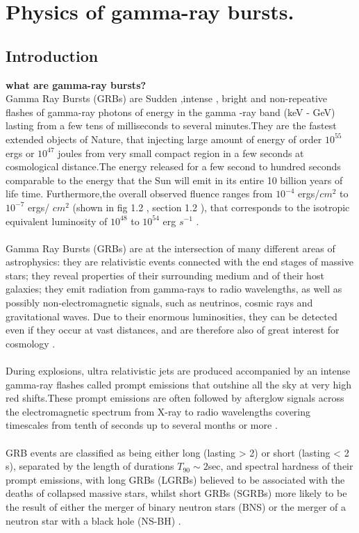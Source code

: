 \setcounter{chapter}{0}
\chapter{Physics of gamma-ray bursts.}
\section{Introduction}
\textbf{what are gamma-ray bursts?}\\
Gamma Ray Bursts (GRBs) are Sudden ,intense , bright and non-repeative flashes of gamma-ray
photons of energy in the gamma -ray band (keV - GeV) lasting from a few tens of milliseconds  to several minutes.They are the fastest extended objects of Nature, that injecting large amount of energy of order $10^{55}$ergs or $ 10^{47} $ joules from very small compact region in a few seconds at cosmological distance.The energy released for a few second to hundred seconds comparable to the energy that  the Sun will emit in its entire 10 billion years of life time. Furthermore,the overall observed fluence ranges from $10^{-4} $ ergs/$ cm^{2}$ to $ 10^{-7} $ ergs/ $ cm^{2} $ (shown in fig 1.2 , section 1.2 ), that corresponds to the isotropic equivalent luminosity of $ 10^{48} $  to  $10^{54} $ erg $ s^{-1} $ \citep{1}.\\\\
Gamma Ray Bursts (GRBs) are at the intersection of many different areas of astrophysics: they are relativistic events connected with the end stages of massive stars; they reveal properties of their surrounding medium and of their host galaxies; they emit radiation from gamma-rays to radio wavelengths, as well as possibly non-electromagnetic signals, such as neutrinos, cosmic rays and gravitational waves. Due to their enormous luminosities, they can be detected even if they occur at vast distances, and are therefore also of great interest for cosmology \citep{2}.\\\\
 During  explosions, ultra relativistic jets are produced accompanied by an intense gamma-ray flashes called prompt emissions that outshine all the sky at very high red shifts.These prompt emissions are often followed by afterglow signals across the electromagnetic spectrum from X-ray to radio wavelengths covering timescales from tenth of seconds up to several months or more \citep{1,2}.\\\\
GRB  events are  classified   as being  either  long  (lasting > 2) or short (lasting < 2 s), separated  by  the length  of durations $T_{90} \sim 2 $sec, and  spectral hardness of their prompt emissions, with long  GRBs (LGRBs) believed to be associated with the  deaths of collapsed  massive  stars, whilst  short  GRBs (SGRBs) more likely to be  the  result of  either  the  merger of  binary  neutron  stars (BNS) or the  merger  of  a neutron  star  with  a black  hole (NS-BH) \citep{3}.\\\\

